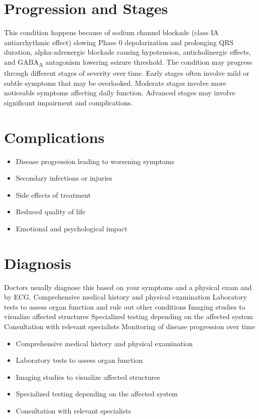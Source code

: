 \section{Progression and Stages}
This condition happens because of sodium channel blockade (class IA antiarrhythmic effect) slowing Phase 0 depolarization and prolonging QRS duration, alpha-adrenergic blockade causing hypotension, anticholinergic effects, and GABA\textsubscript{A} antagonism lowering seizure threshold. The condition may progress through different stages of severity over time. Early stages often involve mild or subtle symptoms that may be overlooked. Moderate stages involve more noticeable symptoms affecting daily function. Advanced stages may involve significant impairment and complications.
\section{Complications}
\begin{itemize}[noitemsep]
  \item Disease progression leading to worsening symptoms
  \item Secondary infections or injuries
  \item Side effects of treatment
  \item Reduced quality of life
  \item Emotional and psychological impact
\end{itemize}
\section{Diagnosis}
Doctors usually diagnose this based on your symptoms and a physical exam and by ECG. Comprehensive medical history and physical examination Laboratory tests to assess organ function and rule out other conditions Imaging studies to visualize affected structures Specialized testing depending on the affected system Consultation with relevant specialists Monitoring of disease progression over time

\begin{itemize}[noitemsep]
  \item Comprehensive medical history and physical examination
  \item Laboratory tests to assess organ function
  \item Imaging studies to visualize affected structures
  \item Specialized testing depending on the affected system
  \item Consultation with relevant specialists
\end{itemize}

